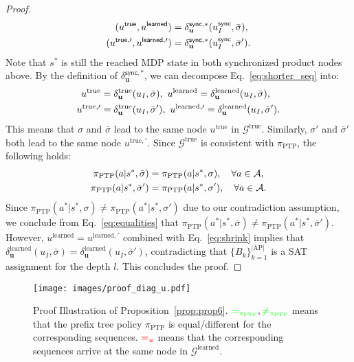 \documentclass[letterpaper, 10 pt, conference]{ieeeconf}
\newcommand{\ptp}{\pi_{\mathrm{PTP}}}
\begin{document}
\begin{proof}
\begin{align}\label{eq:shorter_seq}
    (u^{\textsf{true}}, u^{\textsf{learned}}) &= \delta_{\mathbf{u}}^{\textsf{sync}, *}(u_I^{\textsf{sync}}, \bar \sigma), \notag \\
    (u^{\textsf{true},\prime}, u^{\textsf{learned},\prime}) &= \delta_{\mathbf{u}}^{\textsf{sync}, *}(u_I^{\textsf{sync}}, \bar \sigma').
\end{align}
Note that $s^*$ is still the reached MDP state in both synchronized product nodes above. By the definition of $\delta_{\mathbf{u}}^{\textsf{sync},*}$, we can decompose Eq.~\eqref{eq:shorter_seq} into:
\begin{align}\label{eq:shrink}
     u^{\mathrm{true}} &=                    \delta_{\textbf{u}}^{\mathrm{true}} (u_I, \bar \sigma),\ 
    u^{\mathrm{learned}} =                 \delta_{\textbf{u}}^{\mathrm{learned}} (u_I, \bar \sigma), \notag\\
    u^{\mathrm{true},\prime} &=  \delta_{\textbf{u}}^{\mathrm{true}} (u_I, \bar \sigma'),\ 
    u^{\mathrm{learned},\prime} =  \delta_{\textbf{u}}^{\mathrm{learned}} (u_I, \bar \sigma').
\end{align}
This means that $\sigma$ and $\bar \sigma$ lead to the same node $u^{\mathrm{true}}$ in $\mathcal{G}^{\mathrm{true}}$. Similarly, $\sigma'$ and $\bar \sigma'$ both lead to the same node $u^{\mathrm{true},\prime}$.
Since $\mathcal{G}^{\mathrm{true}}$ is consistent with $\ptp$, the following holds:
\begin{align}\label{eq:equalities}
    \ptp(a|s^*,\bar \sigma) &= \ptp(a|s^*,\sigma) ,\quad  \forall a \in \mathcal{A}, \notag \\
    \ptp(a|s^*,\bar \sigma') &= \ptp(a|s^*,\sigma') ,\quad \forall a \in \mathcal{A}.
\end{align}
Since $\ptp(a^*|s^*, \sigma) \neq \ptp(a^*|s^*, \sigma')$ due to our contradiction assumption, we conclude from Eq.~\eqref{eq:equalities} that $\ptp(a^*|s^*,\bar \sigma) \neq \ptp(a^*|s^*,\bar \sigma')$. However, $u^{\mathrm{learned}} = u^{\mathrm{learned},\prime}$ combined with Eq.~\eqref{eq:shrink} implies that $\delta_{\textbf{u}}^{\mathrm{learned}} (u_I, \bar \sigma) = \delta_{\textbf{u}}^{\mathrm{learned}} (u_I, \bar \sigma')$, contradicting that  $\{B_k\}_{k=1}^{|\mathrm{AP}|}$ is a SAT assignment for the depth $l$. This concludes the proof.
\end{proof}


\begin{figure}[htb!]
    \centering
    \texttt{[image: images/proof\_diag\_u.pdf]}  %
\caption{Proof Illustration of Proposition~\ref{prop:prop6}. ${\color{green}=_{\ptp}},{\color{green}\neq_{\ptp}}$ means that the prefix tree policy $\ptp$ is equal/different for the corresponding sequences. ${\color{red}=_u}$ means that the corresponding sequences arrive at the same node in $\mathcal{G}^{\mathrm{learned}}$.}
    \label{fig:proof_illustration}
\end{figure}



 
\end{document}
